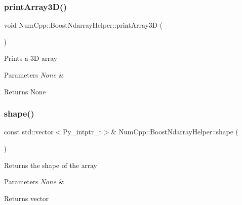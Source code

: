 \subsubsection{\texorpdfstring{print\+Array3\+D()}{printArray3D()}}
{\footnotesize\ttfamily void Num\+Cpp\+::\+Boost\+Ndarray\+Helper\+::print\+Array3D (\begin{DoxyParamCaption}{ }\end{DoxyParamCaption})\hspace{0.3cm}{\ttfamily [inline]}}

Prints a 3D array


\begin{DoxyParams}{Parameters}
{\em None} & \\
\hline
\end{DoxyParams}
\begin{DoxyReturn}{Returns}
None 
\end{DoxyReturn}
\mbox{\label{class_num_cpp_1_1_boost_ndarray_helper_a91fbd5b18e549b43baf78c07d9617c8c}} 
\subsubsection{\texorpdfstring{shape()}{shape()}}
{\footnotesize\ttfamily const std\+::vector$<$Py\+\_\+intptr\+\_\+t$>$\& Num\+Cpp\+::\+Boost\+Ndarray\+Helper\+::shape (\begin{DoxyParamCaption}{ }\end{DoxyParamCaption})\hspace{0.3cm}{\ttfamily [inline]}}

Returns the shape of the array


\begin{DoxyParams}{Parameters}
{\em None} & \\
\hline
\end{DoxyParams}
\begin{DoxyReturn}{Returns}
vector 
\end{DoxyReturn}
\mbox{\label{class_num_cpp_1_1_boost_ndarray_helper_a5e2e1e62abd9da95a83d2539fd94fa30}} 

